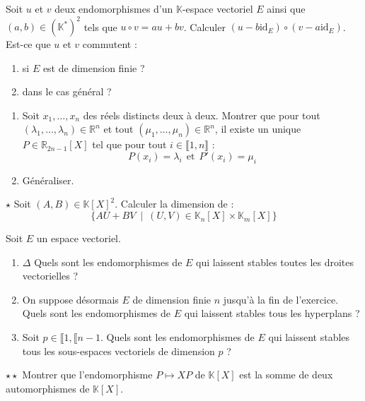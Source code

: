 \documentclass[french,a4paper]{article}
\newcommand{\R}{\mathbb{R}}
\newcommand{\K}{\mathbb{K}}
\newcommand{\st}{^*}
\theoremstyle{plain}
\theoremstyle{definition}
\theoremstyle{remark}
\begin{document}
\begin{ex}[Moulin.43]{}
	Soit $u$ et $v$ deux endomorphismes d'un $\K$-espace vectoriel $E$ ainsi que $(a,b)\in(\K\st)^2$ tels que $u\circ v=au+bv$. Calculer $(u-b\text{id}_E)\circ(v-a\text{id}_E)$. Est-ce que $u$ et $v$ commutent :
	\begin{enumerate}
		\item si $E$ est de dimension finie ?
		\item dans le cas général ?
	\end{enumerate}
\end{ex}

\begin{ex}[Moulin.44]{}
	\begin{enumerate}
		\item Soit $x_1,\ldots,x_n$ des réels distincts deux à deux. Montrer que pour tout $(\lambda_1,\ldots,\lambda_n)\in\R^n$ et tout $(\mu_1,\ldots,\mu_n)\in\R^n$, il existe un unique $P\in\R_{2n-1}[X]$ tel que pour tout $i\in\llbracket1,n\rrbracket$ : $$P(x_i)=\lambda_i\ \ \text{et}\ \ P'(x_i)=\mu_i$$
		\item Généraliser. 
	\end{enumerate}
\end{ex}

\begin{ex}[Moulin.45]{$\star$}
	Soit $(A,B)\in\K[X]^2$. Calculer la dimension de : $$\{AU+BV\ \mid\ (U,V)\in\K_n[X]\times\K_m[X]\}$$
\end{ex}

\begin{ex}[Moulin.46]{}
	Soit $E$ un espace vectoriel.
	\begin{enumerate}
		\item $\Delta$ Quels sont les endomorphismes de $E$ qui laissent stables toutes les droites vectorielles ?
		\item On suppose désormais $E$ de dimension finie $n$ jusqu'à la fin de l'exercice. Quels sont les endomorphismes de $E$ qui laissent stables tous les hyperplans ?
		\item Soit $p\in\llbracket1,\llbracket n-1$. Quels sont les endomorphismes de $E$ qui laissent stables tous les sous-espaces vectoriels de dimension $p$ ?
	\end{enumerate}
\end{ex}

\begin{ex}[Moulin.47]{$\star\star$}
	Montrer que l'endomorphisme $P\mapsto XP$ de $\K[X]$ est la somme de deux automorphismes de $\K[X]$.
\end{ex}
\end{document}
